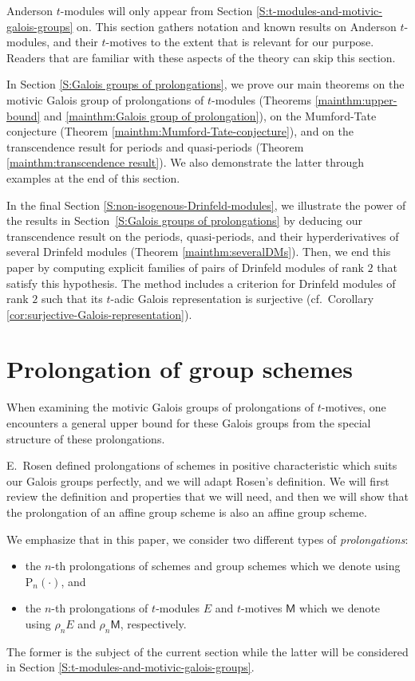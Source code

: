 \documentclass[10pt,a4paper]{amsart}
\theoremstyle{plain} %
\theoremstyle{definition}
\theoremstyle{remark}
\newcommand{\rP}[1]{\mathrm{P}_{\!#1}}
\newcommand{\mot}{\mathsf{M}}  %
\numberwithin{equation}{subsection}
\begin{document}
Anderson $t$-modules will only appear from Section \ref{S:t-modules-and-motivic-galois-groups} on. This section gathers notation and known results on Anderson $t$-modules, and their $t$-motives to the extent that is relevant for our purpose. Readers that are familiar with these aspects of the theory can skip this section.

In Section \ref{S:Galois groups of prolongations}, we prove our main theorems
on the motivic Galois group of prolongations of $t$-modules (Theorems \ref{mainthm:upper-bound} and \ref{mainthm:Galois group of prolongation}), on the Mumford-Tate conjecture (Theorem \ref{mainthm:Mumford-Tate-conjecture}), and on the transcendence result for periods and quasi-periods (Theorem \ref{mainthm:transcendence result}). We also demonstrate the latter through examples at the end of this section.



In the final Section \ref{S:non-isogenous-Drinfeld-modules}, we illustrate the power of the results in Section~\ref{S:Galois groups of prolongations} by deducing our transcendence result on the periods, quasi-periods, and their hyperderivatives of several Drinfeld modules (Theorem \ref{mainthm:severalDMs}).
Then, we end this paper by computing explicit families of pairs of Drinfeld modules of rank $2$ that satisfy this hypothesis. The method includes a criterion for Drinfeld modules of rank $2$ such that its $t$-adic Galois representation is surjective (cf.~Corollary \ref{cor:surjective-Galois-representation}).


\section{Prolongation of group schemes}\label{S:prolongation-of-group-schemes}

When examining the motivic Galois groups of prolongations of $t$-motives, one encounters a general upper bound for these Galois groups from the special structure of these prolongations.

E.~Rosen \cite{er:pda} defined prolongations of schemes in positive characteristic which suits our Galois groups perfectly, and we will adapt Rosen's definition. We will first review the definition and properties that we will need, and then we will show that the prolongation of an affine group scheme is also an affine group scheme.

We emphasize that in this paper, we consider two different types of \emph{prolongations}: 
\begin{itemize} 
\item the $n$-th prolongations of schemes and group schemes which we denote using $\rP{n}(\cdot)$, and 
\item the $n$-th prolongations of $t$-modules $E$ and $t$-motives $\mot$ which we denote using $\rho_nE$ and $\rho_n\mot$, respectively. 
\end{itemize}
The former is the subject of the current section while the latter will be considered in Section \ref{S:t-modules-and-motivic-galois-groups}. 
\end{document}

